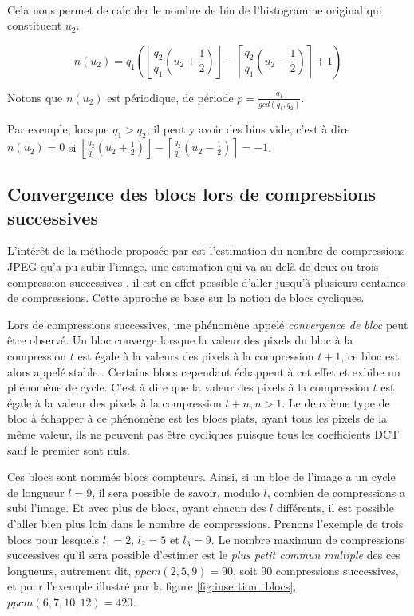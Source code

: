 \documentclass[utf8,final]{stageM2R} %
\begin{document}
\paragraph{}

Cela nous permet de calculer le nombre de bin de l'histogramme original qui constituent $u_2$.

$$n(u_2) = q_1 \left(\left \lfloor \frac{q_2}{q_1} \left (u_2 + \frac{1}{2}\right) \right \rfloor - \left \lceil \frac{q_2}{q_1} \left (u_2 - \frac{1}{2}\right) \right \rceil + 1 \right)$$

Notons que $n(u_2)$ est périodique, de période $p = \frac{q_1}{gcd(q_1, q_2)}$.

Par exemple, lorsque $q_1 > q_2$, il peut y avoir des bins vide, c'est à dire $n(u_2) = 0$ si $\left \lfloor \frac{q_2}{q_1} \left (u_2 + \frac{1}{2}\right) \right \rfloor - \left \lceil \frac{q_2}{q_1} \left (u_2 - \frac{1}{2}\right) \right \rceil = -1$.
\subsection{Convergence des blocs lors de compressions successives}
\label{convergence}
L'intérêt de la méthode proposée par  \autocite{CarneinSB2016TelltaleWatermarks} est l'estimation du nombre de compressions JPEG qu'a pu subir l'image, une estimation qui va au-delà de deux ou trois compression successives \autocite{huang2010detecting}\autocite{lukavs2003estimation}, il est en effet possible d'aller jusqu'à plusieurs centaines de compressions. Cette approche se base sur la notion de blocs cycliques.

Lors de compressions successives, une phénomène appelé \textit{convergence de bloc} peut être observé. Un bloc converge lorsque la valeur des pixels du bloc à la compression $t$ est égale à la valeurs des pixels à la compression $t + 1$, ce bloc est alors appelé stable \autocite{lai2013block}. Certains blocs cependant échappent à cet effet et exhibe un phénomène de cycle. C'est à dire que la valeur des pixels à la compression $t$ est égale à la valeur des pixels à la compression $t + n, n > 1$. Le deuxième type de bloc à échapper à ce phénomène est les blocs plats, ayant tous les pixels de la même valeur, ils ne peuvent pas être cycliques puisque tous les coefficients DCT sauf le premier sont nuls.

Ces blocs sont nommés blocs compteurs. Ainsi, si un bloc de l'image a un cycle de longueur $l=9$, il sera possible de savoir, modulo $l$, combien de compressions a subi l'image. Et avec plus de blocs, ayant chacun des $l$ différents, il est possible d'aller bien plus loin dans le nombre de compressions. Prenons l'exemple de trois blocs pour lesquels $l_{1} = 2$, $l_{2} = 5$ et $l_{3} = 9$. Le nombre maximum de compressions successives qu'il sera possible d'estimer est le \textit{plus petit commun multiple} des ces longueurs, autrement dit, $ppcm(2, 5, 9) = 90$, soit 90 compressions successives, et pour l'exemple illustré par la figure \ref{fig:insertion_blocs}, $ppcm(6, 7, 10, 12) = 420$.
\end{document}

